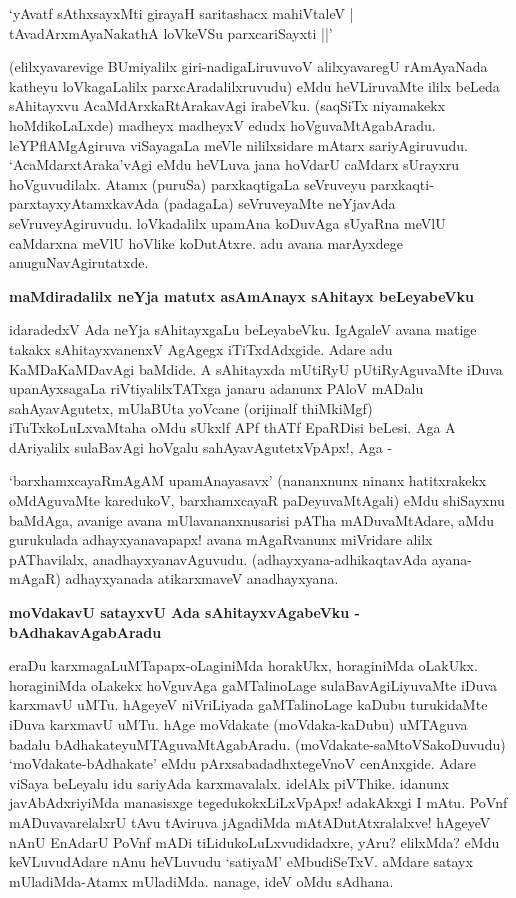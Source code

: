 \begin{shloka}
`yAvatf sAthxsayxMti girayaH saritashacx mahiVtaleV |\\\label{77}
tAvadArxmAyaNakathA loVkeVSu parxcariSayxti ||'
\end{shloka}

(elilxyavarevige BUmiyalilx giri-nadigaLiruvuvoV alilxyavaregU rAmAyaNada katheyu loVkagaLalilx parxcAradalilxruvudu) eMdu heVLiruvaMte ililx beLeda sAhitayxvu AcaMdArxkaRtArakavAgi irabeVku. (saqSiTx niyamakekx hoMdikoLaLxde) madheyx madheyxV edudx hoVguvaMtAgabAradu. leYPflAMgAgiruva viSayagaLa meVle nililxsidare mAtarx sariyAgiruvudu. `AcaMdarxtAraka'vAgi eMdu heVLuva jana hoVdarU caMdarx sUrayxru hoVguvudilalx. Atamx (puruSa) parxkaqtigaLa seVruveyu parxkaqti-parxtayxyAtamxkavAda (padagaLa) seVruveyaMte neYjavAda seVruveyAgiruvudu. loVkadalilx upamAna koDuvAga sUyaRna meVlU caMdarxna meVlU hoVlike koDutAtxre. adu avana marAyxdege anuguNavAgirutatxde.

\noindent
\textbf{maMdiradalilx neYja matutx asAmAnayx sAhitayx beLeyabeVku}

idaradedxV Ada neYja sAhitayxgaLu beLeyabeVku. IgAgaleV avana matige takakx sAhitayxvanenxV AgAgegx iTiTxdAdxgide. Adare adu KaMDaKaMDavAgi baMdide. A sAhitayxda mUtiRyU pUtiRyAguvaMte iDuva upanAyxsagaLa riVtiyalilxTATxga janaru adanunx PAloV mADalu sahAyavAgutetx, mUlaBUta yoVcane (orijinalf thiMkiMgf) iTuTxkoLuLxvaMtaha oMdu sUkxlf APf thATf EpaRDisi beLesi. Aga A dAriyalilx sulaBavAgi hoVgalu sahAyavAgutetxVpApx!, Aga - 

`barxhamxcayaRmAgAM\label{78} upamAnayasavx' (nananxnunx ninanx hatitxrakekx oMdAguvaMte karedukoV, barxhamxcayaR paDeyuvaMtAgali) eMdu shiSayxnu baMdAga, avanige avana mUlavananxnusarisi pATha mADuvaMtAdare, aMdu gurukulada adhayxyanavapapx! avana mAgaRvanunx miVridare alilx pAThavilalx, anadhayxyanavAguvudu. (adhayxyana-adhikaqtavAda ayana-mAgaR) adhayxyanada atikarxmaveV anadhayxyana.

\noindent
\textbf{moVdakavU satayxvU Ada sAhitayxvAgabeVku - bAdhakavAgabAradu}\label{page78}

eraDu karxmagaLuMTapapx-oLaginiMda horakUkx, horaginiMda oLakUkx. horaginiMda oLakekx hoVguvAga gaMTalinoLage sulaBavAgiLiyuvaMte iDuva karxmavU uMTu. hAgeyeV niVriLiyada gaMTalinoLage kaDubu turukidaMte iDuva karxmavU uMTu. hAge moVdakate (moVdaka-kaDubu) uMTAguva badalu bAdhakateyuMTAguvaMtAgabAradu. (moVdakate-saMtoVSakoDuvudu) `moVdakate-bAdhakate' eMdu pArxsabadadhxtegeVnoV cenAnxgide. Adare viSaya beLeyalu idu sariyAda karxmavalalx. idelAlx piVThike. idanunx javAbAdxriyiMda manasisxge tegedukokxLiLxVpApx! adakAkxgi I mAtu. PoVnf mADuvavarelalxrU tAvu tAviruva jAgadiMda mAtADutAtxralalxve! hAgeyeV nAnU EnAdarU PoVnf mADi tiLidukoLuLxvudidadxre, yAru? elilxMda? eMdu keVLuvudAdare nAnu heVLuvudu `satiyaM' eMbudiSeTxV. aMdare satayx mUladiMda-Atamx mUladiMda. nanage, ideV oMdu sAdhana.

